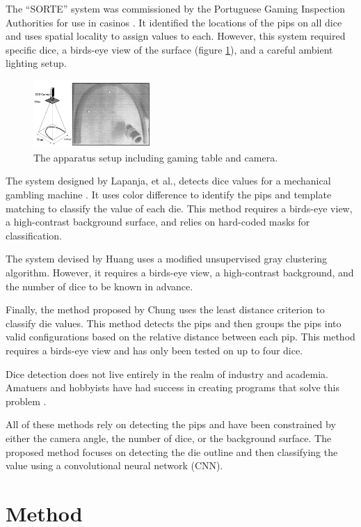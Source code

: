 \documentclass[conference]{IEEEtran}
\begin{document}
The ``SORTE'' system was commissioned by the Portuguese Gaming Inspection Authorities for use in casinos \cite{Correia1995}.
It identified the locations of the pips on all dice and uses spatial locality to assign values to each.
However, this system required specific dice, a birds-eye view of the surface (figure \ref{fig:prior_1a}), and a careful ambient lighting setup.
\begin{figure}
	\centering
	\includegraphics[width=0.4\textwidth]{prior_1a}
	\caption{The apparatus setup including gaming table and camera.}
	\label{fig:prior_1a}
\end{figure}

The system designed by Lapanja, et al., detects dice values for a mechanical gambling machine \cite{Lapanjaa}.
It uses color difference to identify the pips and template matching to classify the value of each die.
This method requires a birds-eye view, a high-contrast background surface, and relies on hard-coded masks for classification.

The system devised by Huang \cite{Huang2008} uses a modified unsupervised gray clustering algorithm. 
However, it requires a birds-eye view, a high-contrast background, and the number of dice to be known in advance.

Finally, the method proposed by Chung \cite{Chung2009} uses the least distance criterion to classify die values.
This method detects the pips and then groups the pips into valid configurations based on the relative distance between each pip.
This method requires a birds-eye view and has only been tested on up to four dice.

Dice detection does not live entirely in the realm of industry and academia.
Amatuers and hobbyists have had success in creating programs that solve this problem \cite{Gideon2018}\cite{Pesce2019}.  

All of these methods rely on detecting the pips and have been constrained by either the camera angle, the number of dice, or the background surface.
The proposed method focuses on detecting the die outline and then classifying the value using a convolutional neural network (CNN).

\section{Method}
\end{document}
